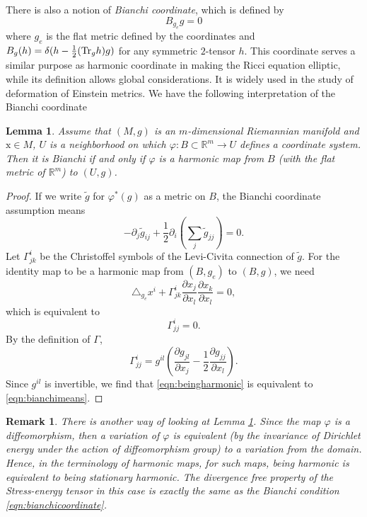 \documentclass{amsart}
\newtheorem{lem}[thm]{Lemma}
\newtheorem{rem}[thm]{Remark}
\newcommand{\Real}{\mathbb R}
\newcommand{\pfrac}[2]{\frac{\partial #1}{\partial #2}}
\newcommand{\bx}{\mathrm{x}}
\numberwithin{equation}{section}
\begin{document}
There is also a notion of {\it Bianchi coordinate}, which is defined by
\begin{equation}
	\label{eqn:bianchicoordinate}
	B_{g_e} g = 0
\end{equation}
where $g_e$ is the flat metric defined by the coordinates and $B_g(h)=\delta(h-\frac{1}{2}({\rm Tr}_g h) g)$ for any symmetric $2$-tensor $h$. This coordinate serves a similar purpose as harmonic coordinate in making the Ricci equation elliptic, while its definition allows global considerations. It is widely used in the study of deformation of Einstein metrics.
We have the following interpretation of the Bianchi coordinate
\begin{lem}
	\label{lem:bianchiharmonic}
	Assume that $(M,g)$ is an $m$-dimensional Riemannian manifold and $\bx \in M$, $U$ is a neighborhood on which $\varphi:B\subset \Real^m\to U$ defines a coordinate system. Then it is Bianchi if and only if $\varphi$ is a harmonic map from $B$ (with the flat metric of $\Real^m$) to $(U,g)$.
\end{lem}
\begin{proof}
	If we write $\tilde{g}$ for $\varphi^*(g)$ as a metric on $B$, the Bianchi coordinate assumption means
	\begin{equation}
		\label{eqn:bianchimeans}
		- \partial_j \tilde{g}_{ij} + \frac{1}{2} \partial_i (\sum_j \tilde{g}_{jj})=0.
	\end{equation}
	Let $\Gamma^i_{jk}$ be the Christoffel symbols of the Levi-Civita connection of $\tilde{g}$. 
	For the identity map to be a harmonic map from $(B,g_e)$ to $(B,g)$, we need
	\begin{equation}
		\label{eqn:beingharmonic}
		\triangle_{g_e} x^i + \Gamma^i_{jk} \pfrac{x_j}{x_l}\pfrac{x_k}{x_l}=0,
	\end{equation}
	which is equivalent to 
	\[
		\Gamma^i_{jj}=0.
	\]
	By the definition of $\Gamma$,
	\[
		\Gamma^i_{jj}= g^{il}\left( \pfrac{g_{jl}}{x_j} - \frac{1}{2}\pfrac{g_{jj}}{x_l} \right).
	\]
	Since $g^{il}$ is invertible, we find that \eqref{eqn:beingharmonic} is equivalent to \eqref{eqn:bianchimeans}.
\end{proof}
\begin{rem}
	There is another way of looking at Lemma \ref{lem:bianchiharmonic}.
	Since the map $\varphi$ is a diffeomorphism, then a variation of $\varphi$ is equivalent (by the invariance of Dirichlet energy under the action of diffeomorphism group) to a variation from the domain. Hence, in the terminology of harmonic maps, for such maps, being harmonic is equivalent to being stationary harmonic. The divergence free property of the Stress-energy tensor in this case is exactly the same as the Bianchi condition \eqref{eqn:bianchicoordinate}. 
\end{rem}
\end{document}

